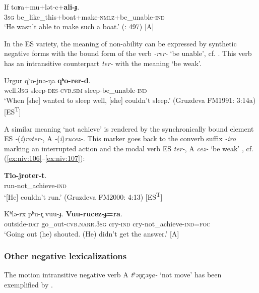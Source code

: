 \documentclass[output=paper,colorlinks,citecolor=brown]{langscibook}
\begin{document}
\ea\label{ex:niv:104}
    \gll If toʁa+mu+lət-c+\textbf{ali-ɟ}. \\ 
         \textsc{3sg} be\_like\_this+boat+make-\textsc{nmlz}+be\_unable-\textsc{ind} \\
    \glt ‘He wasn’t able to make such a boat.’ (\citealt{SaveljevaTaksami1970}: 497) [A]
\z 

In the ES variety, the meaning of non-ability can be expressed by synthetic negative forms with the bound form of the verb \textit{-rer-} ‘be unable’, cf. . This verb has an intransitive counterpart \textit{ter-} with the meaning ‘be weak’.

\ea\label{ex:niv:105}
    \gll Urgur qʰo-jnə{}-ŋa \textbf{qʰo-rer-d}. \\ 
         well.\textsc{3sg} sleep-\textsc{des-cvb.sim} sleep-be\_unable\textsc{{}-ind} \\
    \glt ‘When [she] wanted to sleep well, [she] couldn’t sleep.’ (Gruzdeva FM1991: 3:14a) [ES\textsuperscript{T}]
\z 

A similar meaning ‘not achieve’ is rendered by the synchronically bound element ES \textit{-}(\textit{i})\textit{roter-}, A \textit{-}(\textit{i})\textit{rucez-}. This marker goes back to the converb suffix \textit{-iro} marking an interrupted action and the modal verb ES \textit{ter-}, A \textit{cez-} ‘be weak’ \citep[163]{Panfilov1965}, cf. (\ref{ex:niv:106}--\ref{ex:niv:107}):

\ea\label{ex:niv:106}
    \gll \textbf{Tlo-jroter-t}. \\ 
         run-not\_achieve-\textsc{ind} \\
    \glt ‘[He] couldn’t run.’ (Gruzdeva FM2000: 4:13) [ES\textsuperscript{T}]
\z 

\ea\label{ex:niv:107}
    \gll Kʰlə{}-rx pʰu-r̥ vuu-ɟ. \textbf{Vuu-rucez-ɟ=ra}. \\ 
         outside-\textsc{dat} go\_out-\textsc{cvb.narr.3sg} cry-\textsc{ind} cry-not\_achieve\textsc{{}-ind=foc} \\
    \glt ‘Going out (he) shouted. (He) didn’t get the answer.’ \citep[163]{Panfilov1965} [A]
\z 

\subsubsection{Other negative lexicalizations}

The motion intransitive negative verb A \textit{tʰəŋr̥əŋa-} ‘not move’ has been exemplified by .
\end{document}

